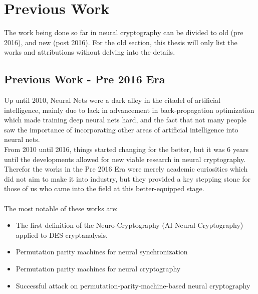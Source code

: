 \documentclass[a4paper, 12pt]{report}
\begin{document}
\section{\textbf{Previous Work}}
The work being done so far in neural cryptography can be divided to old (pre 2016), and new (post 2016). For the old section, this thesis will only list the works and attributions without delving into the details.
\subsection{\textbf{Previous Work - Pre 2016 Era}}
Up until 2010, Neural Nets were a dark alley in the citadel of artificial intelligence, mainly due to lack in advancement in back-propagation optimization which made training deep neural nets hard, and the fact that not many people saw the importance of incorporating other areas of artificial intelligence into neural nets.\\
From 2010 until 2016, things started changing for the better, but it was 6 years until the developments allowed for new viable research in neural cryptography.\\
Therefor the works in the Pre 2016 Era were merely academic curiosities which did not aim to make it into industry, but they provided a key stepping stone for those of us who came into the field at this better-equipped stage.\\\\
The most notable of these works are:
\begin{itemize}[nosep]
	\item The first definition of the Neuro-Cryptography (AI Neural-Cryptography) applied to DES cryptanalysis. ~\citep{s.dourlens.free.fr/AppliedNeuroCryptography}
	\item Permutation parity machines for neural synchronization ~\citep{1751-8121-42-19-195002}
	\item Permutation parity machines for neural cryptography ~\citep{PhysRevE.81.066117}
	\item Successful attack on permutation-parity-machine-based neural cryptography ~\citep{PhysRevE.85.025101}
\end{itemize}
\end{document}
